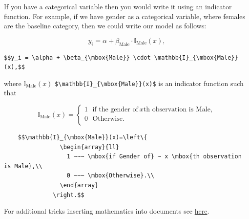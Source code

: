 \documentclass[
  letterpaper,
  DIV=11,
  numbers=noendperiod]{scrartcl}
\begin{document}
If you have a categorical variable then you would write it using an
indicator function. For example, if we have gender as a categorical
variable, where females are the baseline category, then we could write
our model as follows:

\[y_i = \alpha + \beta_{\mbox{Male}} \cdot \mathbb{I}_{\mbox{Male}}(x),\]

\begin{verbatim}
$$y_i = \alpha + \beta_{\mbox{Male}} \cdot \mathbb{I}_{\mbox{Male}}(x),$$
\end{verbatim}

where \(\mathbb{I}_{\mbox{Male}}(x)\)
\texttt{\$\textbackslash{}mathbb\{I\}\_\{\textbackslash{}mbox\{Male\}\}(x)\$}
is an indicator function such that

\[\mathbb{I}_{\mbox{Male}}(x)=\left\{
                \begin{array}{ll}
                  1 ~~~ \mbox{if the gender of} ~ x \mbox{th observation is Male},\\
                  0 ~~~ \mbox{Otherwise}.\\
                \end{array}
              \right.\]

\begin{verbatim}
    $$\mathbb{I}_{\mbox{Male}}(x)=\left\{
                \begin{array}{ll}
                  1 ~~~ \mbox{if Gender of} ~ x \mbox{th observation is Male},\\
                  0 ~~~ \mbox{Otherwise}.\\
                \end{array}
              \right.$$
\end{verbatim}

\begin{tcolorbox}[enhanced jigsaw, colback=white, toprule=.15mm, arc=.35mm, colbacktitle=quarto-callout-note-color!10!white, titlerule=0mm, colframe=quarto-callout-note-color-frame, title=\textcolor{quarto-callout-note-color}{\faInfo}\hspace{0.5em}{Note}, bottomtitle=1mm, toptitle=1mm, coltitle=black, rightrule=.15mm, opacityback=0, bottomrule=.15mm, breakable, leftrule=.75mm, left=2mm, opacitybacktitle=0.6]

For additional tricks inserting mathematics into documents see
\href{https://quarto.org/docs/visual-editor/technical.html}{here}.

\end{tcolorbox}
\end{document}

